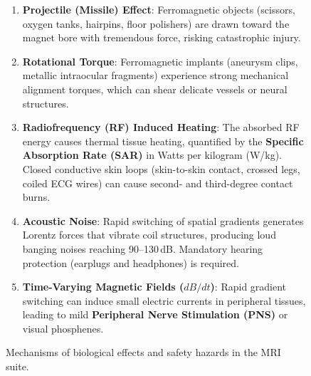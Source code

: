 \documentclass[11pt,a4paper]{article}
\begin{document}
\begin{figure}[htbp]
\centering
\begin{tcolorbox}[colback=red!5!white,colframe=red!75!black,arc=1mm,title=\sffamily Key MRI Hazards and Bio-effects]
\small
\begin{enumerate}
    \item \textbf{Projectile (Missile) Effect}: Ferromagnetic objects (scissors, oxygen tanks, hairpins, floor polishers) are drawn toward the magnet bore with tremendous force, risking catastrophic injury.
    \item \textbf{Rotational Torque}: Ferromagnetic implants (aneurysm clips, metallic intraocular fragments) experience strong mechanical alignment torques, which can shear delicate vessels or neural structures.
    \item \textbf{Radiofrequency (RF) Induced Heating}: The absorbed RF energy causes thermal tissue heating, quantified by the \textbf{Specific Absorption Rate (SAR)} in Watts per kilogram (W/kg). Closed conductive skin loops (skin-to-skin contact, crossed legs, coiled ECG wires) can cause second- and third-degree contact burns.
    \item \textbf{Acoustic Noise}: Rapid switching of spatial gradients generates Lorentz forces that vibrate coil structures, producing loud banging noises reaching 90--130\,dB. Mandatory hearing protection (earplugs and headphones) is required.
    \item \textbf{Time-Varying Magnetic Fields ($dB/dt$)}: Rapid gradient switching can induce small electric currents in peripheral tissues, leading to mild \textbf{Peripheral Nerve Stimulation (PNS)} or visual phosphenes.
\end{enumerate}
\end{tcolorbox}
\caption{Mechanisms of biological effects and safety hazards in the MRI suite.}
\label{fig:safety_summary}
\end{figure}
\end{document}
